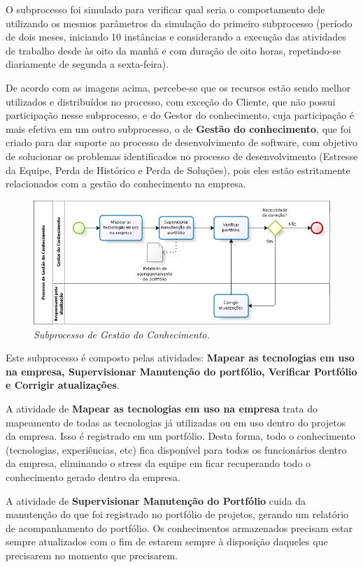 O subprocesso foi simulado para verificar qual seria o comportamento dele utilizando os mesmos parâmetros da simulação do primeiro subprocesso (período de dois meses, iniciando 10 instâncias e considerando a execução das atividades de trabalho desde às oito da manhã e com duração de oito horas, repetindo-se diariamente de segunda a sexta-feira).

De acordo com as imagens acima, percebe-se que os recursos estão sendo melhor utilizados e distribuídos no processo, com exceção do Cliente, que não possui participação nesse subprocesso, e do Gestor do conhecimento, cuja participação é mais efetiva em um outro subprocesso, o de \textbf{Gestão do conhecimento}, que foi criado para dar suporte ao processo de desenvolvimento de software, com objetivo de solucionar os problemas identificados no processo de desenvolvimento (Estresse da Equipe, Perda de Histórico e Perda de Soluções), pois eles estão estritamente relacionados com a gestão do conhecimento na empresa.

\begin{figure}[H]
\centering\includegraphics[scale=0.5]{figuras/subprocessoGC.png}
\caption{\textit{Subprocesso de Gestão do Conhecimento.}}
\end{figure}

Este subprocesso é composto pelas atividades: \textbf{Mapear as tecnologias em uso na empresa, Supervisionar Manutenção do portfólio, Verificar Portfólio e Corrigir atualizações}.

A atividade de \textbf{Mapear as tecnologias em uso na empresa} trata do mapeamento de todas as tecnologias já utilizadas ou em uso dentro do projetos da empresa. Isso é registrado em um portfólio. Desta forma, todo o conhecimento (tecnologias, experiências, etc) fica disponível para todos os funcionários dentro da empresa, eliminando o stress da equipe em ficar recuperando todo o conhecimento gerado dentro da empresa.

A atividade de \textbf{Supervisionar Manutenção do Portfólio} cuida da manutenção do que foi registrado no portfólio de projetos, gerando um relatório de acompanhamento do portfólio. Os conhecimentos armazenados precisam estar sempre atualizados com o fim de estarem sempre à disposição daqueles que precisarem no momento que precisarem. 

